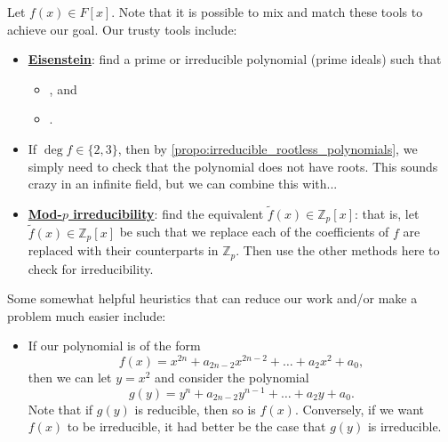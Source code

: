 \documentclass[notoc,notitlepage,nobib]{tufte-book}
\begin{document}
Let $f(x) \in F[x]$. Note that it is possible to mix and match these tools to
achieve our goal. Our trusty tools include:
\begin{itemize}
  \item \textbf{\hyperref[propo:eisenstein_s_criterion]{Eisenstein}}: find a
    prime or irreducible polynomial (prime ideals) such that
    \begin{itemize}
      \item {}, and
      \item {}.
    \end{itemize}

  \item If $\deg f \in \{ 2, 3 \}$, then by
    \cref{propo:irreducible_rootless_polynomials}, we simply need to check that
    the polynomial does not have roots. This sounds crazy in an infinite field,
    but we can combine this with...

  \item \textbf{\hyperref[propo:mod_p_irreducibility_test]{Mod-$p$
    irreducibility}}: find the equivalent $\tilde{f}(x) \in \mathbb{Z}_p[x]$:
    that is, let $\tilde{f}(x) \in \mathbb{Z}_p[x]$ be such that we replace each
    of the coefficients of $f$ are replaced with their counterparts in
    $\mathbb{Z}_p$. Then use the other methods here to check for irreducibility.
\end{itemize}

Some somewhat helpful heuristics that can reduce our work and/or make a problem
much easier include:
\begin{itemize}
  \item If our polynomial is of the form
    \begin{equation*}
      f(x) = x^{2n} + a_{2n-2}x^{2n-2} + \hdots + a_{2}x^2 + a_0,
    \end{equation*}
    then we can let $y = x^2$ and consider the polynomial
    \begin{equation*}
      g(y) = y^n + a_{2n-2}y^{n-1} + \hdots + a_2y + a_0.
    \end{equation*}
    Note that if $g(y)$ is reducible, then so is $f(x)$. Conversely, if we want
    $f(x)$ to be irreducible, it had better be the case that $g(y)$ is
    irreducible.
\end{itemize}
\end{document}
